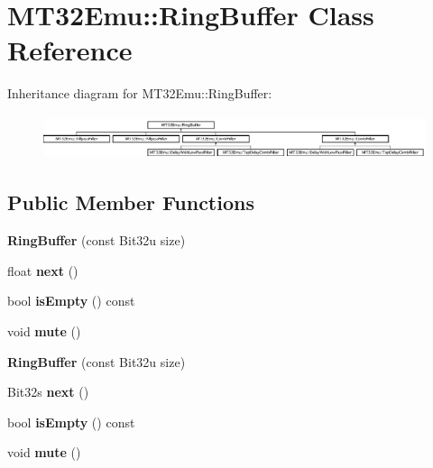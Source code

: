 \hypertarget{classMT32Emu_1_1RingBuffer}{\section{M\-T32\-Emu\-:\-:Ring\-Buffer Class Reference}
\label{classMT32Emu_1_1RingBuffer}
}
Inheritance diagram for M\-T32\-Emu\-:\-:Ring\-Buffer\-:\begin{figure}[H]
\begin{center}
\leavevmode
\includegraphics[height=1.284404cm]{classMT32Emu_1_1RingBuffer}
\end{center}
\end{figure}
\subsection*{Public Member Functions}
\begin{DoxyCompactItemize}
\item 
\hypertarget{classMT32Emu_1_1RingBuffer_a9ea3e1491058c048b3fd6ff3a42ce55f}{{\bfseries Ring\-Buffer} (const Bit32u size)}\label{classMT32Emu_1_1RingBuffer_a9ea3e1491058c048b3fd6ff3a42ce55f}

\item 
\hypertarget{classMT32Emu_1_1RingBuffer_aea169845998bbea598fd1c67f9fe0841}{float {\bfseries next} ()}\label{classMT32Emu_1_1RingBuffer_aea169845998bbea598fd1c67f9fe0841}

\item 
\hypertarget{classMT32Emu_1_1RingBuffer_a33f099538049316cf9ce3a95f14d7139}{bool {\bfseries is\-Empty} () const }\label{classMT32Emu_1_1RingBuffer_a33f099538049316cf9ce3a95f14d7139}

\item 
\hypertarget{classMT32Emu_1_1RingBuffer_a4ce06b7b7de09e48fc1a4f73a01c7763}{void {\bfseries mute} ()}\label{classMT32Emu_1_1RingBuffer_a4ce06b7b7de09e48fc1a4f73a01c7763}

\item 
\hypertarget{classMT32Emu_1_1RingBuffer_a107170c1ec49b44412b997159e54db23}{{\bfseries Ring\-Buffer} (const Bit32u size)}\label{classMT32Emu_1_1RingBuffer_a107170c1ec49b44412b997159e54db23}

\item 
\hypertarget{classMT32Emu_1_1RingBuffer_a91048eb3e56ce9c9c39787f56dfe8e66}{Bit32s {\bfseries next} ()}\label{classMT32Emu_1_1RingBuffer_a91048eb3e56ce9c9c39787f56dfe8e66}

\item 
\hypertarget{classMT32Emu_1_1RingBuffer_a3824f928f4733052daeb441ab079adb1}{bool {\bfseries is\-Empty} () const }\label{classMT32Emu_1_1RingBuffer_a3824f928f4733052daeb441ab079adb1}

\item 
\hypertarget{classMT32Emu_1_1RingBuffer_aacc45a48c069545f473967ea39a8e862}{void {\bfseries mute} ()}\label{classMT32Emu_1_1RingBuffer_aacc45a48c069545f473967ea39a8e862}

\end{DoxyCompactItemize}
